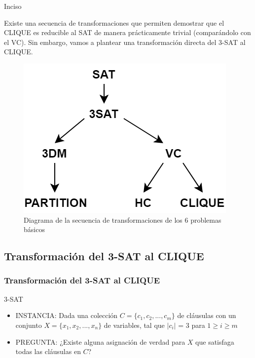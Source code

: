 \documentclass{beamer}
\begin{document}

\begin{frame}{Inciso}

    Existe una secuencia de transformaciones que permiten demostrar que el CLIQUE es reducible al SAT de manera prácticamente trivial (comparándolo con el VC). Sin embargo, vamos a plantear una transformación directa del 3-SAT al CLIQUE.

    \begin{figure}
    \includegraphics[width=0.5\linewidth]{img/problem-diagram.png}
    \caption{Diagrama de la secuencia de transformaciones de los 6 problemas básicos}
    \end{figure}

    
\end{frame}


\subsection{Transformación del 3-SAT al CLIQUE}
\begin{frame}
\frametitle{Transformación del 3-SAT al CLIQUE}
    \begin{block}{3-SAT}
    \begin{itemize}
        \item INSTANCIA: Dada una colección $C = \{c_{1}, c_{2}, ..., c_{m}\}$ de cláusulas con un conjunto $X = \{x_{1}, x_{2}, ..., x_{n}\}$ de variables, tal que $\vert c_{i} \vert$ = 3 para $1 \geq \textit{i} \geq m$
        \item PREGUNTA: ¿Existe alguna asignación de verdad para $X$ que satisfaga todas las cláusulas en $C$?
    \end{itemize}
    \end{block}
\end{frame}

\end{document}
